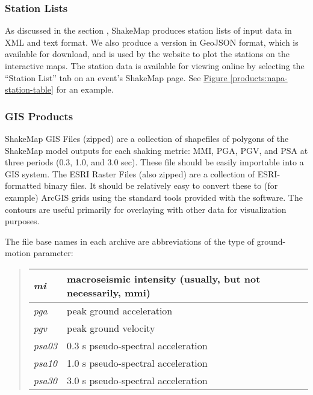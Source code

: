 \documentclass[letterpaper,10pt,english]{sphinxmanual}
\begin{document}
\subsubsection{Station Lists}
\label{products:station-lists}
As discussed in the section {\hyperref[products:sec\string-input\string-files]{}}, ShakeMap produces station lists of input data
in XML and text format. We also produce a version in GeoJSON format, which is available for
download, and is used by the website to plot the stations on the interactive maps. The station
data is available for viewing online by selecting the “Station List” tab on an event's ShakeMap
page. See \hyperref[products:napa-station-table]{Figure  \ref*{products:napa-station-table}} for an example.
\begin{figure}[htbp]\begin{flushleft}
\capstart

\texttt{[image: \{Napa\_station\_table]}.png}
\caption{Station table view from ShakeMap event-specific webpages. Link is at right of tabs above the map (see \hyperref[products:napa-event-page]{Figure  \ref*{products:napa-event-page}}).}\label{products:napa-station-table}\label{products:id13}\end{flushleft}\end{figure}


\subsubsection{GIS Products}
\label{products:gis-products}
ShakeMap GIS Files (zipped) are a collection of shapefiles of polygons of the
ShakeMap model outputs for each shaking metric: MMI, PGA, PGV, and PSA at three
periods (0.3, 1.0, and 3.0 sec).  These file should be easily importable into a GIS
system. The ESRI Raster
Files (also zipped) are a collection of ESRI-formatted binary files.  It should
be relatively easy to convert these to (for example) ArcGIS grids using the
standard tools provided with the software. The contours are useful primarily for
overlaying with other data for visualization purposes.

The file base names in each archive are abbreviations of the
type of ground-motion parameter:
\begin{quote}

\begin{tabulary}{\linewidth}{|L|L|}
\hline

\emph{mi}
 & 
macroseismic intensity (usually, but not necessarily, mmi)
\\
\hline
\emph{pga}
 & 
peak ground acceleration
\\
\hline
\emph{pgv}
 & 
peak ground velocity
\\
\hline
\emph{psa03}
 & 
0.3 s pseudo-spectral acceleration
\\
\hline
\emph{psa10}
 & 
1.0 s pseudo-spectral acceleration
\\
\hline
\emph{psa30}
 & 
3.0 s pseudo-spectral acceleration
\\
\hline\end{tabulary}

\end{quote}
\end{document}
